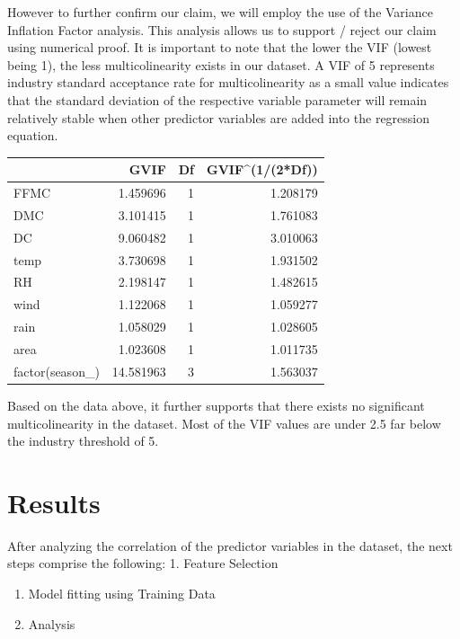 \documentclass[conference,final,]{IEEEtran}
\begin{document}
However to further confirm our claim, we will employ the use of the
Variance Inflation Factor analysis. This analysis allows us to support /
reject our claim using numerical proof. It is important to note that the
lower the VIF (lowest being 1), the less multicolinearity exists in our
dataset. A VIF of 5 represents industry standard acceptance rate for
multicolinearity as a small value indicates that the standard deviation
of the respective variable parameter will remain relatively stable when
other predictor variables are added into the regression equation.

\begin{tabular}{l|r|r|r}
\hline
  & GVIF & Df & GVIF\textasciicircum{}(1/(2*Df))\\
\hline
FFMC & 1.459696 & 1 & 1.208179\\
\hline
DMC & 3.101415 & 1 & 1.761083\\
\hline
DC & 9.060482 & 1 & 3.010063\\
\hline
temp & 3.730698 & 1 & 1.931502\\
\hline
RH & 2.198147 & 1 & 1.482615\\
\hline
wind & 1.122068 & 1 & 1.059277\\
\hline
rain & 1.058029 & 1 & 1.028605\\
\hline
area & 1.023608 & 1 & 1.011735\\
\hline
factor(season\_) & 14.581963 & 3 & 1.563037\\
\hline
\end{tabular}

Based on the data above, it further supports that there exists no
significant multicolinearity in the dataset. Most of the VIF values are
under 2.5 far below the industry threshold of 5.

\hypertarget{results}{%
\section{Results}\label{results}}

After analyzing the correlation of the predictor variables in the
dataset, the next steps comprise the following: 1. Feature Selection

\begin{enumerate}
\def\labelenumi{\arabic{enumi}.}
\setcounter{enumi}{1}
\item
  Model fitting using Training Data 
\item
  Analysis 
\end{enumerate}
\end{document}
